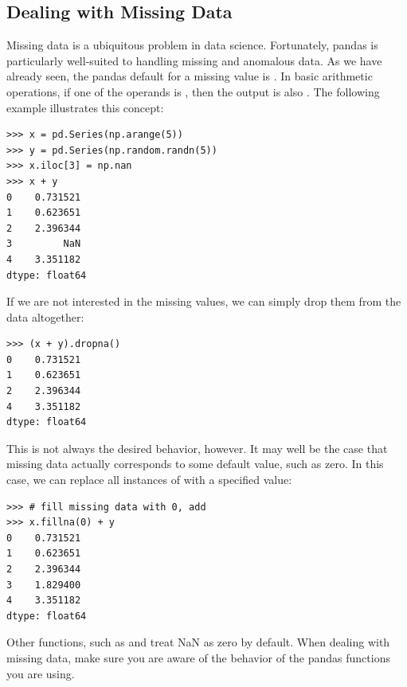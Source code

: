 \subsection*{Dealing with Missing Data}
Missing data is a ubiquitous problem in data science. Fortunately, pandas is particularly well-suited to
handling missing and anomalous data. As we have already seen, the pandas default for a missing value is .
In basic arithmetic operations, if one of the operands is , then the output is also .
The following example illustrates this concept:
\begin{lstlisting}
>>> x = pd.Series(np.arange(5))
>>> y = pd.Series(np.random.randn(5))
>>> x.iloc[3] = np.nan
>>> x + y
0    0.731521
1    0.623651
2    2.396344
3         NaN
4    3.351182
dtype: float64
\end{lstlisting}
If we are not interested in the missing values, we can simply drop them from the data altogether:
\begin{lstlisting}
>>> (x + y).dropna()
0    0.731521
1    0.623651
2    2.396344
4    3.351182
dtype: float64
\end{lstlisting}

This is not always the desired behavior, however. It may well be the case that missing data actually corresponds to
some default value, such as zero. In this case, we can replace all instances of  with a specified value:
\begin{lstlisting}
>>> # fill missing data with 0, add
>>> x.fillna(0) + y
0    0.731521
1    0.623651
2    2.396344
3    1.829400
4    3.351182
dtype: float64
\end{lstlisting}

Other functions, such as  and  treat NaN as zero by default.
When dealing with missing data, make sure you are aware of the behavior of the pandas
functions you are using.

